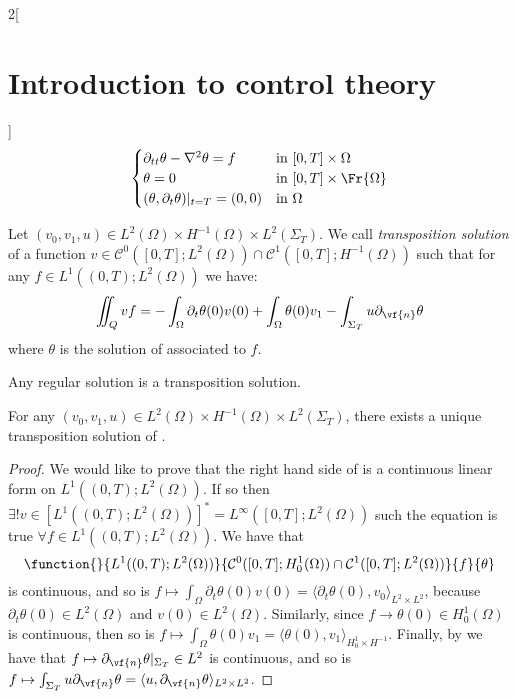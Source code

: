 \documentclass[../../../main_math.tex]{subfiles}
\begin{document}
\begin{multicols}{2}[\section{Introduction to control theory}]
  \begin{equation}\label{ICT:wave_equation_control_dual}
    \begin{cases}
      \partial_{tt} \theta - \laplacian \theta = f & \text{in } [0,T]\times \Omega      \\
      \theta = 0                                   & \text{in } [0,T]\times \Fr{\Omega} \\
      (\theta,\partial_t \theta)|_{t=T} = (0,0)    & \text{in } \Omega
    \end{cases}
  \end{equation}
  \begin{definition}
    Let $(v_0,v_1,u)\in L^2(\Omega)\times H^{-1}(\Omega)\times L^2(\Sigma_T)$. We call \emph{transposition solution} of  a function $v\in \mathcal{C}^0([0,T]; L^2(\Omega))\cap \mathcal{C}^1([0,T]; H^{-1}(\Omega))$ such that for any $f\in L^1((0,T); L^2(\Omega))$ we have:
    \begin{equation}\label{ICT:transposition_solution}
      \iint_Q vf = -\int_\Omega \partial_t\theta(0) v(0) +\int_\Omega \theta(0) v_1-\int_{\Sigma_T} u \partial_{\vf{n}} \theta
    \end{equation}
    where $\theta$ is the solution of  associated to $f$.
  \end{definition}
  \begin{remark}
    Any regular solution is a transposition solution.
  \end{remark}
  \begin{theorem}
    For any $(v_0,v_1,u)\in L^2(\Omega)\times H^{-1}(\Omega)\times L^2(\Sigma_T)$, there exists a unique transposition solution of .
  \end{theorem}
  \begin{proof}
    We would like to prove that the right hand side of  is a continuous linear form on $L^1((0,T); L^2(\Omega))$. If so then $\exists! v\in [L^1((0,T); L^2(\Omega))]^*=L^\infty([0,T]; L^2(\Omega))$ such the equation is true $\forall f\in L^1((0,T); L^2(\Omega))$. We have that
    $$
      \function{}{L^1((0,T); L^2(\Omega))}{\mathcal{C}^0([0,T]; H_0^1(\Omega))\cap \mathcal{C}^1([0,T]; L^2(\Omega))}{f}{\theta}
    $$
    is continuous, and so is $f\mapsto \int_\Omega \partial_t\theta(0) v(0)=\langle \partial_t\theta(0),v_0\rangle_{L^2\times L^2}$, because $\partial_t\theta(0)\in L^2(\Omega)$ and $v(0)\in L^2(\Omega)$. Similarly, since $f\to \theta(0)\in H_0^1(\Omega)$ is continuous, then so is $f\mapsto \int_\Omega \theta(0) v_1=\langle \theta(0),v_1\rangle_{H_0^1\times H^{-1}}$. Finally, by  we have that $f\mapsto \partial_{\vf{n}}\theta|_{\Sigma_T}\in L^2$ is continuous, and so is $f\mapsto \int_{\Sigma_T} u \partial_{\vf{n}} \theta=\langle u,\partial_{\vf{n}}\theta\rangle_{L^2\times L^2}$.

\end{proof}
\end{multicols}
\end{document}
